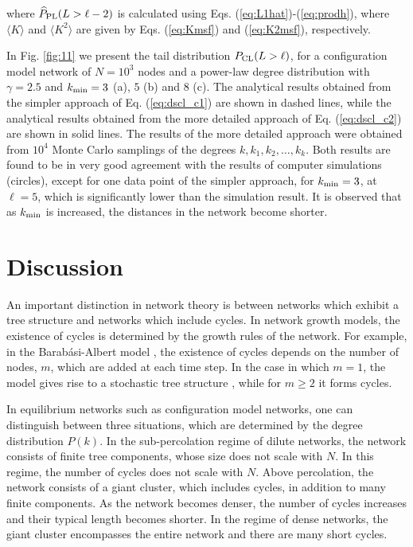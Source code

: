 \documentclass[preprint,pre,superscriptaddress,showpacs]{revtex4}
\begin{document}
\noindent
where $\widehat P_{\rm PL}(L>\ell-2)$ is calculated using 
Eqs. (\ref{eq:L1hat})-(\ref{eq:prodh}),
where $\langle K \rangle$ and $\langle K^2 \rangle$
are given by Eqs. (\ref{eq:Kmsf}) and (\ref{eq:K2msf}),
respectively.

In Fig. \ref{fig:11} we present the
tail distribution $P_{\rm CL}(L>\ell)$,
for a configuration model network of $N=10^{3}$ nodes and a 
power-law degree distribution with
$\gamma=2.5$ and $k_{\rm min}=3$ (a), $5$ (b) and $8$ (c).
The analytical results
obtained from the
simpler approach of
Eq. (\ref{eq:dscl_c1}) 
are shown in dashed lines,
while the analytical results obtained from 
the more detailed approach of
Eq. (\ref{eq:dscl_c2}) 
are shown in solid lines.
The results of the more detailed approach were obtained from 
$10^4$ Monte Carlo samplings of the degrees $k,k_1,k_2,\dots,k_k$.
Both results are found to be in very good agreement with the results of 
computer simulations (circles), except for one data point of the simpler 
approach, for $k_{\rm min}=3$, at $\ell=5$, which is significantly 
lower than the simulation result.
It is observed that as $k_{\rm min}$ is increased, the distances
in the network become shorter.

\section{Discussion}

An important distinction in network theory is between networks
which exhibit a tree structure and networks which include cycles.
In network growth models, the existence of cycles is determined
by the growth rules of the network. For example, in the 
Barab\'asi-Albert model
\cite{Barabasi1999,Albert2002},
the existence of cycles depends
on the number of nodes, $m$, which are added at each time step. 
In the case in which $m=1$, the model gives rise to a stochastic tree structure
\cite{Drmota1997,Drmota2005}, 
while for $m \ge 2$ it forms cycles.

In equilibrium networks such as
configuration model networks, one can distinguish between three
situations, which are determined by the degree distribution $P(k)$.
In the sub-percolation regime of dilute networks, the network 
consists of finite tree components, whose size does not scale with $N$.
In this regime, the number of cycles does not scale with $N$.
Above percolation, the network consists of a giant cluster,
which includes cycles, in addition to many finite components.
As the network becomes denser, the number of cycles increases
and their typical length becomes shorter.
In the regime of dense networks, the giant cluster encompasses the
entire network and there are many short cycles.
\end{document}
